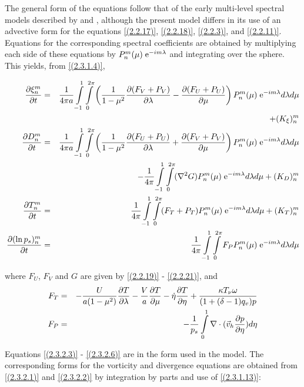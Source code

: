 The general form of the equations follow that of the early multi-level
spectral models described by \cite{bourke74} and \cite{hoskins75},
although the present model differs in its use of an advective form for
the equations \ref{(2.2.17)}, \ref{(2.2.18)}, \ref{(2.2.3)}, and
\ref{(2.2.11)}. Equations for the corresponding spectral coefficients
are obtained by multiplying each side of these equations by
$P^m_n(\mu)\;\mbox{e}^{-im\lambda}$ and integrating over the sphere. This
yields, from \ref{(2.3.1.4)},

\begin{eqnarray}
\frac {\partial \xi^m_n} {\partial t} & = & \frac{1}{4\pi a}\int\limits_{-1}^{1}
\int\limits_{0}^{2\pi}\left(\frac{1}{1-\mu^2}\frac {\partial (F_V+P_V)} {\partial \lambda}
-\frac {\partial (F_U+P_U)} {\partial \mu}\right)P^m_n(\mu)\;\mbox{e}^{-im\lambda}d\lambda d\mu\nonumber\\
&&+(K_{\xi})^m_n
\label{(2.3.2.1)}\\
\frac {\partial D^m_n} {\partial t} & = & \frac{1}{4\pi a}\int\limits_{-1}^{1}
\int\limits_{0}^{2\pi}\left(\frac{1}{1-\mu^2}\frac {\partial (F_U+P_U)} {\partial \lambda}
+\frac {\partial (F_V+P_V)} {\partial \mu}\right)P^m_n(\mu)\;\mbox{e}^{-im\lambda}d\lambda d\mu\nonumber\\
&&-\frac{1}{4\pi}\int\limits_{-1}^{1}\int\limits_{0}^{2\pi}(\nabla^2G)P^m_n(\mu)\;\mbox{e}^{-im\lambda}d\lambda d\mu + (K_{D})^m_n
\label{(2.3.2.2)}\\
\frac {\partial T^m_n} {\partial t} & = & \frac{1}{4\pi}\int\limits_{-1}^{1}
\int\limits_{0}^{2\pi}(F_T+P_T)P^m_n(\mu)\;\mbox{e}^{-im\lambda}d\lambda d\mu
+(K_{T})^m_n
\label{(2.3.2.3)}\\
\frac {\partial (\ln p_s)^m_n} {\partial t} & = & \frac{1}{4\pi}\int\limits_{-1}^{1}
\int\limits_{0}^{2\pi}F_PP^m_n(\mu)\;\mbox{e}^{-im\lambda}d\lambda d\mu
\label{(2.3.2.6)}
\end{eqnarray}

where $F_U$, $F_V$ and $G$ are given by \ref{(2.2.19)} - \ref{(2.2.21)}, and\\

\begin{eqnarray}
F_T & = & -\frac{U}{a(1-\mu^2)}\frac {\partial T} {\partial \lambda}-\frac{V}{a}\frac {\partial T} {\partial \mu}
-\dot{\eta}\frac {\partial T} {\partial \eta}+\frac{\kappa T_{\nu}\omega}{(1+(\delta-1)q_v)p}
\label{(2.3.2.7)}\\
F_P & = & -\frac{1}{p_s}\int\limits_{0}^{1}
\nabla\cdot(\vec{v}_h\frac {\partial p} {\partial \eta})d\eta
\label{(2.3.2.10)}
\end{eqnarray}

Equations \ref{(2.3.2.3)} - \ref{(2.3.2.6)} are in the form used in the
model. The corresponding forms for the vorticity and divergence
equations are obtained from \ref{(2.3.2.1)} and \ref{(2.3.2.2)} by integration by parts and use of \ref{(2.3.1.13)}:

